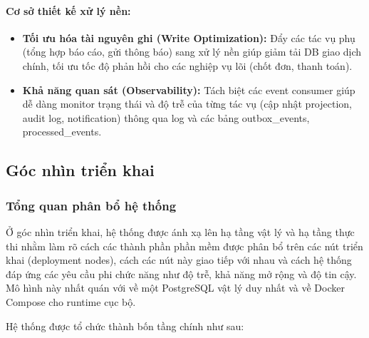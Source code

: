 \paragraph{Cơ sở thiết kế xử lý nền:}
\begin{itemize}
  \item \textbf{Tối ưu hóa tài nguyên ghi (Write Optimization):} Đẩy các tác vụ phụ (tổng hợp báo cáo, gửi thông báo) sang xử lý nền giúp giảm tải DB giao dịch chính, tối ưu tốc độ phản hồi cho các nghiệp vụ lõi (chốt đơn, thanh toán).
  \item \textbf{Khả năng quan sát (Observability):} Tách biệt các event consumer giúp dễ dàng monitor trạng thái và độ trễ của từng tác vụ (cập nhật projection, audit log, notification) thông qua log và các bảng \textsf{outbox\_events}, \textsf{processed\_events}.
\end{itemize}

\subsection{Góc nhìn triển khai}\label{sec:deployment-view}
\subsubsection{Tổng quan phân bổ hệ thống}

Ở góc nhìn triển khai, hệ thống được ánh xạ lên hạ tầng vật lý và hạ tầng thực thi nhằm làm rõ cách các thành phần phần mềm được phân bổ trên các nút triển khai (deployment nodes), cách các nút này giao tiếp với nhau và cách hệ thống đáp ứng các yêu cầu phi chức năng như độ trễ, khả năng mở rộng và độ tin cậy. Mô hình này nhất quán với  về một PostgreSQL vật lý duy nhất và  về Docker Compose cho runtime cục bộ.

Hệ thống được tổ chức thành bốn tầng chính như sau:

